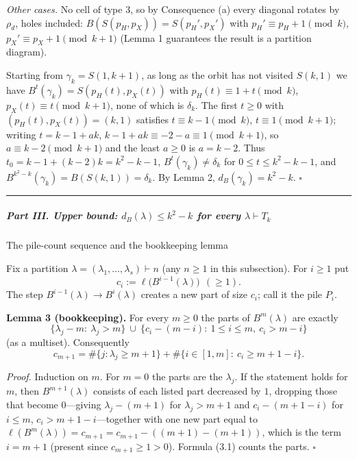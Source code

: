 \documentclass[11pt,a4paper]{article}
\begin{document}
\emph{Other cases.} No cell of type 3, so by Consequence (a) every
diagonal rotates by \(\rho_d\), holes included:
\(B(S(p_H,p_X))=S(p_H',p_X')\) with \(p_H'\equiv p_H+1\pmod k\),
\(p_X'\equiv p_X+1\pmod{k+1}\) (Lemma 1 guarantees the result is a
partition diagram).

Starting from \(\gamma_k=S(1,k+1)\), as long as the orbit has not
visited \(S(k,1)\) we have \(B^t(\gamma_k)=S(p_H(t),p_X(t))\) with
\(p_H(t)\equiv1+t\pmod k\), \(p_X(t)\equiv t\pmod{k+1}\), none of which
is \(\delta_k\). The first \(t\ge0\) with \((p_H(t),p_X(t))=(k,1)\)
satisfies \(t\equiv k-1\pmod k\), \(t\equiv1\pmod{k+1}\); writing
\(t=k-1+ak\), \(k-1+ak\equiv-2-a\equiv1\pmod{k+1}\), so
\(a\equiv k-2\pmod{k+1}\) and the least \(a\ge0\) is \(a=k-2\). Thus
\(t_0=k-1+(k-2)k=k^2-k-1\), \(B^t(\gamma_k)\ne\delta_k\) for
\(0\le t\le k^2-k-1\), and \(B^{k^2-k}(\gamma_k)=B(S(k,1))=\delta_k\).
By Lemma 2, \(d_B(\gamma_k)=k^2-k\). \(\square\)

\begin{center}\rule{0.5\linewidth}{0.5pt}\end{center}

\subparagraph{\texorpdfstring{Part III. Upper bound:
\(d_B(\lambda)\le k^2-k\) for every
\(\lambda\vdash T_k\)}{Part III. Upper bound: d\_B(\textbackslash lambda)\textbackslash le k\^{}2-k for every \textbackslash lambda\textbackslash vdash T\_k}}\label{part-iii.-upper-bound-d_blambdale-k2-k-for-every-lambdavdash-t_k}

The pile-count sequence and the bookkeeping lemma

Fix a partition \(\lambda=(\lambda_1,\dots,\lambda_s)\vdash n\) (any
\(n\ge1\) in this subsection). For \(i\ge1\) put
\[c_i:=\ell\big(B^{i-1}(\lambda)\big)\ \ (\ge1).\] The step
\(B^{i-1}(\lambda)\to B^{i}(\lambda)\) creates a new part of size
\(c_i\); call it the pile \(P_i\).

\textbf{Lemma 3 (bookkeeping).} For every \(m\ge0\) the parts of
\(B^m(\lambda)\) are exactly
\[\{\lambda_j-m:\ \lambda_j>m\}\ \cup\ \{c_i-(m-i):\ 1\le i\le m,\ c_i>m-i\}\]
(as a multiset). Consequently
\[c_{m+1}=\#\{j:\lambda_j\ge m+1\}+\#\{i\in[1,m]:\ c_i\ge m+1-i\}.\tag{3.1}\]

\emph{Proof.} Induction on \(m\). For \(m=0\) the parts are the
\(\lambda_j\). If the statement holds for \(m\), then
\(B^{m+1}(\lambda)\) consists of each listed part decreased by \(1\),
dropping those that become \(0\)---giving \(\lambda_j-(m+1)\) for
\(\lambda_j>m+1\) and \(c_i-(m+1-i)\) for \(i\le m\),
\(c_i>m+1-i\)---together with one new part equal to
\(\ell(B^m(\lambda))=c_{m+1}=c_{m+1}-((m+1)-(m+1))\), which is the term
\(i=m+1\) (present since \(c_{m+1}\ge1>0\)). Formula (3.1) counts the
parts. \(\square\)
\end{document}

